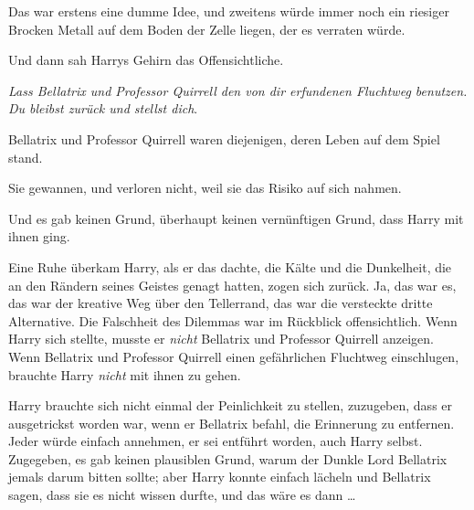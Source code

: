 Das war erstens eine dumme Idee, und zweitens würde immer noch ein riesiger Brocken Metall auf dem Boden der Zelle liegen, der es verraten würde.

Und dann sah Harrys Gehirn das Offensichtliche.

\emph{Lass Bellatrix und Professor Quirrell den von dir erfundenen Fluchtweg benutzen. Du bleibst zurück und stellst dich}.

Bellatrix und Professor Quirrell waren diejenigen, deren Leben auf dem Spiel stand.

Sie gewannen, und verloren nicht, weil sie das Risiko auf sich nahmen.

Und es gab keinen Grund, überhaupt keinen vernünftigen Grund, dass Harry mit ihnen ging.

Eine Ruhe überkam Harry, als er das dachte, die Kälte und die Dunkelheit, die an den Rändern seines Geistes genagt hatten, zogen sich zurück. Ja, das war es, das war der kreative Weg über den Tellerrand, das war die versteckte dritte Alternative. Die Falschheit des Dilemmas war im Rückblick offensichtlich. Wenn Harry sich stellte, musste er \emph{nicht} Bellatrix und Professor Quirrell anzeigen. Wenn Bellatrix und Professor Quirrell einen gefährlichen Fluchtweg einschlugen, brauchte Harry \emph{nicht} mit ihnen zu gehen.

Harry brauchte sich nicht einmal der Peinlichkeit zu stellen, zuzugeben, dass er ausgetrickst worden war, wenn er Bellatrix befahl, die Erinnerung zu entfernen. Jeder würde einfach annehmen, er sei entführt worden, auch Harry selbst. Zugegeben, es gab keinen plausiblen Grund, warum der Dunkle Lord Bellatrix jemals darum bitten sollte; aber Harry konnte einfach lächeln und Bellatrix sagen, dass sie es nicht wissen durfte, und das wäre es dann …

